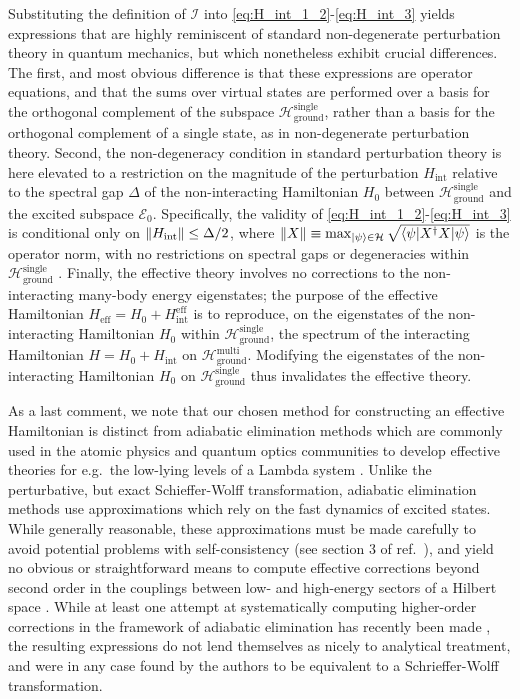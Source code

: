 \documentclass[preprint,showkeys,nofootinbib]{revtex4-1}
\renewcommand{\t}{\text} %
\newcommand{\bk}{\braket} %
\newcommand{\E}{\mathcal{E}}
\renewcommand{\H}{\mathcal{H}}
\newcommand{\I}{\mathcal{I}}
\newcommand{\1}{\mathds{1}}
\begin{document}
Substituting the definition of $\I$ into
\eqref{eq:H_int_1_2}-\eqref{eq:H_int_3} yields expressions that are
highly reminiscent of standard non-degenerate perturbation theory in
quantum mechanics, but which nonetheless exhibit crucial differences.
The first, and most obvious difference is that these expressions are
operator equations, and that the sums over virtual states are
performed over a basis for the orthogonal complement of the subspace
$\H_{\t{ground}}^{\t{single}}$, rather than a basis for the orthogonal
complement of a single state, as in non-degenerate perturbation
theory.  Second, the non-degeneracy condition in standard perturbation
theory is here elevated to a restriction on the magnitude of the
perturbation $H_{\t{int}}$ relative to the spectral gap $\Delta$ of
the non-interacting Hamiltonian $H_0$ between
$\H_{\t{ground}}^{\t{single}}$ and the excited subspace $\E_0$.
Specifically, the validity of \eqref{eq:H_int_1_2}-\eqref{eq:H_int_3}
is conditional only on $\norm{H_{\t{int}}}\le\Delta/2$, where
$\norm{X}\equiv\max_{\ket\psi\in\H}\sqrt{\bk{\psi|X^\dag X|\psi}}$ is
the operator norm, with no restrictions on spectral gaps or
degeneracies within $\H_{\t{ground}}^{\t{single}}$ \cite{davis1969new,
  bravyi2011schrieffer}.  Finally, the effective theory involves no
corrections to the non-interacting many-body energy eigenstates; the
purpose of the effective Hamiltonian
$H_{\t{eff}} = H_0 + H_{\t{int}}^{\t{eff}}$ is to reproduce, on the
eigenstates of the non-interacting Hamiltonian $H_0$ within
$\H_{\t{ground}}^{\t{single}}$, the spectrum of the interacting
Hamiltonian $H = H_0 + H_{\t{int}}$ on $\H_{\t{ground}}^{\t{multi}}$.
Modifying the eigenstates of the non-interacting Hamiltonian $H_0$ on
$\H_{\t{ground}}^{\t{single}}$ thus invalidates the effective theory.

As a last comment, we note that our chosen method for constructing an
effective Hamiltonian is distinct from adiabatic elimination methods
which are commonly used in the atomic physics and quantum optics
communities to develop effective theories for e.g.~the low-lying
levels of a Lambda system \cite{brion2007adiabatic,
  james2007effective, reiter2012effective, sanz2016adiabatic}.  Unlike
the perturbative, but exact Schieffer-Wolff transformation, adiabatic
elimination methods use approximations which rely on the fast dynamics
of excited states.  While generally reasonable, these approximations
must be made carefully to avoid potential problems with
self-consistency (see section 3 of ref.~\cite{brion2007adiabatic}),
and yield no obvious or straightforward means to compute effective
corrections beyond second order in the couplings between low- and
high-energy sectors of a Hilbert space \cite{james2007effective,
  reiter2012effective, sanz2016adiabatic}.  While at least one attempt
at systematically computing higher-order corrections in the framework
of adiabatic elimination has recently been made
\cite{sanz2016adiabatic}, the resulting expressions do not lend
themselves as nicely to analytical treatment, and were in any case
found by the authors to be equivalent to a Schrieffer-Wolff
transformation.
\end{document}
